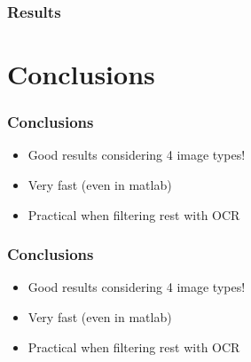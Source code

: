 \documentclass{beamer}
\begin{document}
\frame
{
  \frametitle{Results}
	\begin{figure}[!ht]
	\centering


	\end{figure}
}

\section{Conclusions}
\frame
{
  \frametitle{Conclusions}
	
  \begin{itemize}
  \item <+-| alert@+> Good results considering 4 image types!
  \item <+-| alert@+> Very fast (even in matlab)
  \item <+-| alert@+> Practical when filtering rest with OCR
  \end{itemize}
}
\frame
{
  \frametitle{Conclusions}
	
  \begin{itemize}
  \item Good results considering 4 image types!
  \item Very fast (even in matlab)
  \item Practical when filtering rest with OCR
  \end{itemize}
}
\end{document}
